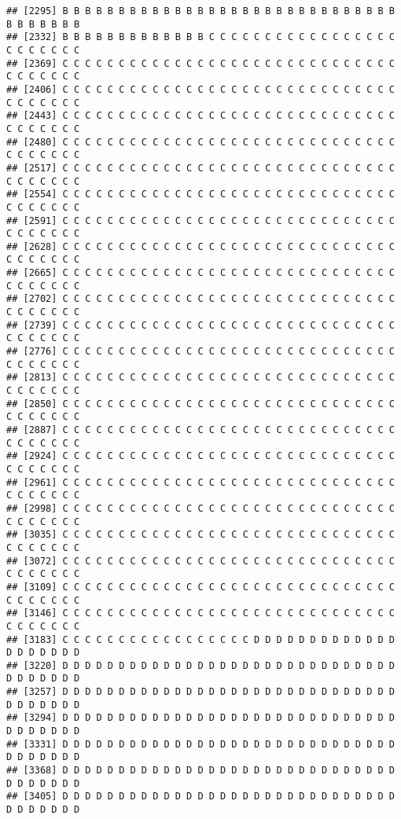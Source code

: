 \documentclass[]{article}
\begin{document}
\begin{verbatim}
## [2295] B B B B B B B B B B B B B B B B B B B B B B B B B B B B B B B B B B B B B
## [2332] B B B B B B B B B B B B B C C C C C C C C C C C C C C C C C C C C C C C C
## [2369] C C C C C C C C C C C C C C C C C C C C C C C C C C C C C C C C C C C C C
## [2406] C C C C C C C C C C C C C C C C C C C C C C C C C C C C C C C C C C C C C
## [2443] C C C C C C C C C C C C C C C C C C C C C C C C C C C C C C C C C C C C C
## [2480] C C C C C C C C C C C C C C C C C C C C C C C C C C C C C C C C C C C C C
## [2517] C C C C C C C C C C C C C C C C C C C C C C C C C C C C C C C C C C C C C
## [2554] C C C C C C C C C C C C C C C C C C C C C C C C C C C C C C C C C C C C C
## [2591] C C C C C C C C C C C C C C C C C C C C C C C C C C C C C C C C C C C C C
## [2628] C C C C C C C C C C C C C C C C C C C C C C C C C C C C C C C C C C C C C
## [2665] C C C C C C C C C C C C C C C C C C C C C C C C C C C C C C C C C C C C C
## [2702] C C C C C C C C C C C C C C C C C C C C C C C C C C C C C C C C C C C C C
## [2739] C C C C C C C C C C C C C C C C C C C C C C C C C C C C C C C C C C C C C
## [2776] C C C C C C C C C C C C C C C C C C C C C C C C C C C C C C C C C C C C C
## [2813] C C C C C C C C C C C C C C C C C C C C C C C C C C C C C C C C C C C C C
## [2850] C C C C C C C C C C C C C C C C C C C C C C C C C C C C C C C C C C C C C
## [2887] C C C C C C C C C C C C C C C C C C C C C C C C C C C C C C C C C C C C C
## [2924] C C C C C C C C C C C C C C C C C C C C C C C C C C C C C C C C C C C C C
## [2961] C C C C C C C C C C C C C C C C C C C C C C C C C C C C C C C C C C C C C
## [2998] C C C C C C C C C C C C C C C C C C C C C C C C C C C C C C C C C C C C C
## [3035] C C C C C C C C C C C C C C C C C C C C C C C C C C C C C C C C C C C C C
## [3072] C C C C C C C C C C C C C C C C C C C C C C C C C C C C C C C C C C C C C
## [3109] C C C C C C C C C C C C C C C C C C C C C C C C C C C C C C C C C C C C C
## [3146] C C C C C C C C C C C C C C C C C C C C C C C C C C C C C C C C C C C C C
## [3183] C C C C C C C C C C C C C C C C C D D D D D D D D D D D D D D D D D D D D
## [3220] D D D D D D D D D D D D D D D D D D D D D D D D D D D D D D D D D D D D D
## [3257] D D D D D D D D D D D D D D D D D D D D D D D D D D D D D D D D D D D D D
## [3294] D D D D D D D D D D D D D D D D D D D D D D D D D D D D D D D D D D D D D
## [3331] D D D D D D D D D D D D D D D D D D D D D D D D D D D D D D D D D D D D D
## [3368] D D D D D D D D D D D D D D D D D D D D D D D D D D D D D D D D D D D D D
## [3405] D D D D D D D D D D D D D D D D D D D D D D D D D D D D D D D D D D D D D

\end{verbatim}
\end{document}
